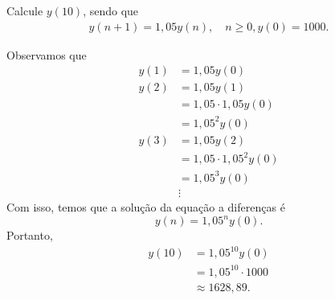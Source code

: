 \begin{exeresol}
  Calcule $y(10)$, sendo que
  \begin{align}
    y(n+1) = 1,05y(n),\quad n\geq0,
    y(0) = 1000.
  \end{align}
\end{exeresol}
\begin{resol}
  Observamos que
  \begin{align}
    y(1) &= 1,05y(0)\\
    y(2) &= 1,05y(1)\\
    &= 1,05\cdot 1,05y(0) \\
    &= 1,05^2y(0)\\
    y(3) &= 1,05y(2)\\
    &=1,05\cdot 1,05^2y(0)\\
    &= 1,05^3y(0)\\
    &\vdots
  \end{align}
  Com isso, temos que a solução da equação a diferenças é
  \begin{equation}
    y(n) = 1,05^ny(0).
  \end{equation}
  Portanto,
  \begin{align}
    y(10) &= 1,05^{10}y(0) \\
    &= 1,05^{10}\cdot 1000 \\
    &\approx 1628,89.
  \end{align}
\end{resol}

